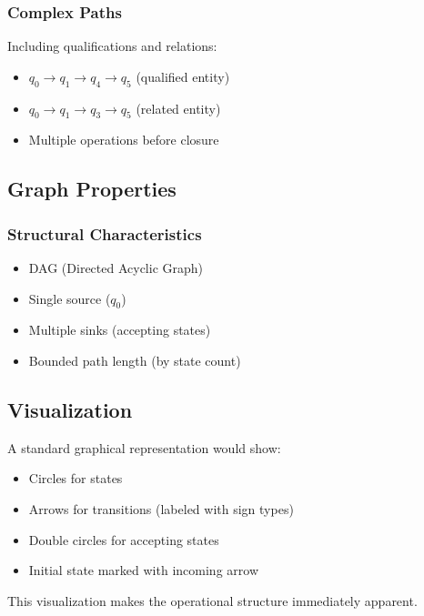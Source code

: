 \subsubsection{Complex Paths}
Including qualifications and relations:
\begin{itemize}
    \item $q_0 \rightarrow q_1 \rightarrow q_4 \rightarrow q_5$ (qualified entity)
    \item $q_0 \rightarrow q_1 \rightarrow q_3 \rightarrow q_5$ (related entity)
    \item Multiple operations before closure
\end{itemize}

\subsection{Graph Properties}

\subsubsection{Structural Characteristics}
\begin{itemize}
    \item DAG (Directed Acyclic Graph)
    \item Single source ($q_0$)
    \item Multiple sinks (accepting states)
    \item Bounded path length (by state count)
\end{itemize}

\subsection{Visualization}

A standard graphical representation would show:
\begin{itemize}
    \item Circles for states
    \item Arrows for transitions (labeled with sign types)
    \item Double circles for accepting states
    \item Initial state marked with incoming arrow
\end{itemize}

This visualization makes the operational structure immediately apparent.
